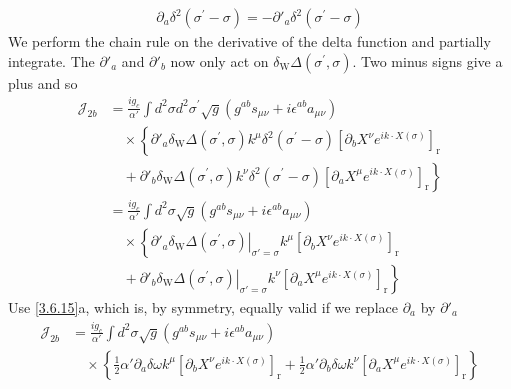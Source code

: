 \begin{tcolorbox}[breakable]
		\begin{align}
			\partial_a \delta^2\left(\sigma^{\prime}-\sigma\right) = -\partial'_a \delta^2\left(\sigma^{\prime}-\sigma\right)
		\end{align}
		We perform the chain rule on the derivative of the delta function and partially integrate. The $\partial'_a$ and $\partial'_b$ now only act on $\delta_{\mathrm{W}} \Delta\left(\sigma^{\prime}, \sigma\right)$. Two minus signs give a plus and so
		\begin{align}
			\mathcal{J}_{2 b} &= \frac{i g_c}{\alpha'} \int d^2 \sigma d^2 \sigma^{\prime} \sqrt{g}\left(g^{a b} s_{\mu \nu}+i \epsilon^{a b} a_{\mu \nu}\right) \nonumber \\
			&\quad \times\left\{\partial'_a \delta_{\mathrm{W}} \Delta\left(\sigma^{\prime}, \sigma\right) k^\mu \delta^2\left(\sigma^{\prime}-\sigma\right)\left[\partial_b X^\nu e^{i k \cdot X(\sigma)}\right]_{\mathrm{r}}\right. \nonumber \\
			&\quad + \left.\partial'_b \delta_{\mathrm{W}} \Delta\left(\sigma^{\prime}, \sigma\right) k^\nu \delta^2\left(\sigma^{\prime}-\sigma\right)\left[\partial_a X^\mu e^{i k \cdot X(\sigma)}\right]_{\mathrm{r}}\right\} \nonumber \\
			&= \frac{i g_c}{\alpha'} \int d^2 \sigma \sqrt{g}\left(g^{a b} s_{\mu \nu}+i \epsilon^{a b} a_{\mu \nu}\right) \nonumber \\
			&\quad \times\left\{\left.\partial'_a \delta_{\mathrm{W}} \Delta\left(\sigma^{\prime}, \sigma\right)\right|_{\sigma'=\sigma} k^\mu\left[\partial_b X^\nu e^{i k \cdot X(\sigma)}\right]_{\mathrm{r}}\right. \nonumber \\
			&\quad + \left.\left.\partial'_b \delta_{\mathrm{W}} \Delta\left(\sigma^{\prime}, \sigma\right)\right|_{\sigma'=\sigma} k^\nu\left[\partial_a X^\mu e^{i k \cdot X(\sigma)}\right]_{\mathrm{r}}\right\}
		\end{align}
		Use \eqref{3.6.15}a, which is, by symmetry, equally valid if we replace $\partial_a$ by $\partial'_a$
		\begin{align}
			\mathcal{J}_{2 b} &= \frac{i g_c}{\alpha'} \int d^2 \sigma \sqrt{g}\left(g^{a b} s_{\mu \nu}+i \epsilon^{a b} a_{\mu \nu}\right) \nonumber \\
			&\quad \times\left\{\frac{1}{2} \alpha' \partial_a \delta \omega k^\mu\left[\partial_b X^\nu e^{i k \cdot X(\sigma)}\right]_{\mathrm{r}} + \frac{1}{2} \alpha' \partial_b \delta \omega k^\nu\left[\partial_a X^\mu e^{i k \cdot X(\sigma)}\right]_{\mathrm{r}}\right\} \nonumber \\

\end{align}
\end{tcolorbox}
